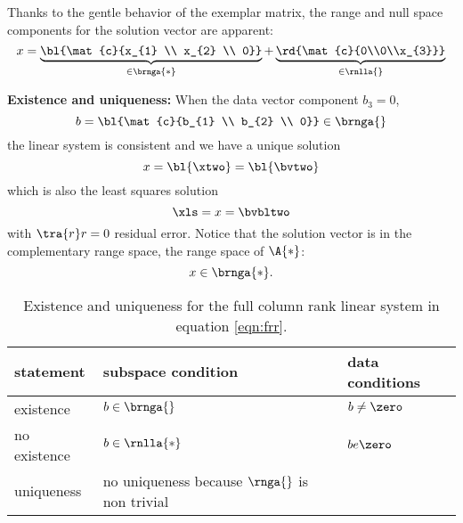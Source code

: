 Thanks to the gentle behavior of the exemplar matrix, the range and null space components for the solution vector are apparent:
  \begin{equation}
      x = \underbrace{\bl{\mat{c}{x_{1} \\ x_{2} \\ 0}}}_{\in\brnga{*}} + \underbrace{\rd{\mat{c}{0\\0\\x_{3}}}}_{\in\rnlla{}}
  \end{equation}

{\bf{Existence and uniqueness:}}
When the data vector component $b_{3} = 0$, 
  \begin{equation}
      b = \bl{\mat{c}{b_{1} \\ b_{2} \\ 0}} \in \brnga{}
  \end{equation}
the linear system is consistent and we have a unique solution 
  \begin{equation}
    x = \bl{\xtwo} = \bl{\bvtwo}
  \end{equation}
which is also the least squares solution
  \begin{equation}
    \xls = x = \bvbltwo
  \end{equation}
with $\tra{r}r = 0$ residual error. Notice that the solution vector is in the complementary range space, the range space of $\A{*}$:
  \begin{equation}
      x \in \brnga{*}.
  \end{equation}

    \begin{table}[t]
    	\caption{Existence and uniqueness for the full column rank linear system in equation \eqref{eqn:frr}.}
    	\begin{center}
    		\begin{tabular}{lll}
    		  statement & subspace condition & data conditions\\\hline
    		  existence    & $b\in\brnga{}$  & $b\ne\zero$ \\
    		  no existence & $b\in\rnlla{*}$ & $be\zero$ \\
		  	  uniqueness   & no uniqueness because $\rnga{}$ is non trivial
    		\end{tabular}
    	\end{center}
    	\label{tab:ftola spaces}
    \end{table}%

